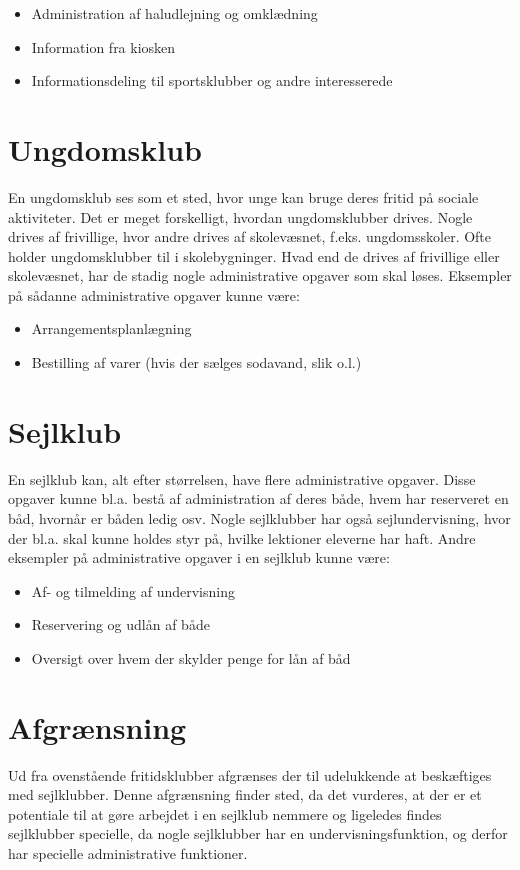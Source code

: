\begin{itemize}
  \item Administration af haludlejning og omklædning 
  \item Information fra kiosken
  \item Informationsdeling til sportsklubber og andre interesserede
\end{itemize}


\section{Ungdomsklub}

En ungdomsklub ses som et sted, hvor unge kan bruge deres fritid på sociale aktiviteter. Det er meget
forskelligt, hvordan ungdomsklubber drives. Nogle drives af frivillige, hvor andre drives af skolevæsnet, f.eks. ungdomsskoler\citep{ung1}.
Ofte holder ungdomsklubber til i skolebygninger. 
Hvad end de drives af frivillige eller skolevæsnet, har de stadig nogle administrative opgaver som skal løses. Eksempler på sådanne administrative
opgaver kunne være:

\begin{itemize}
  \item Arrangementsplanlægning
  \item Bestilling af varer (hvis der sælges sodavand, slik o.l.)
\end{itemize}

\section{Sejlklub}

En sejlklub kan, alt efter størrelsen, have flere administrative opgaver. Disse opgaver kunne bl.a. bestå af
administration af deres både, hvem har reserveret en båd, hvornår er båden ledig osv. Nogle sejlklubber har
også sejlundervisning, hvor der bl.a. skal kunne holdes styr på, hvilke lektioner eleverne har haft. 
Andre eksempler på administrative opgaver i en sejlklub kunne være:

\begin{itemize}
  \item Af- og tilmelding af undervisning
  \item Reservering og udlån af både
  \item Oversigt over hvem der skylder penge for lån af båd
\end{itemize}

\section{Afgrænsning}

Ud fra ovenstående fritidsklubber afgrænses der til udelukkende at beskæftiges med sejlklubber. 
Denne afgrænsning finder sted, da det vurderes, at der er et potentiale til at gøre arbejdet i en sejlklub nemmere og ligeledes findes sejlklubber specielle, da nogle sejlklubber har en undervisningsfunktion, og derfor har specielle administrative funktioner.
